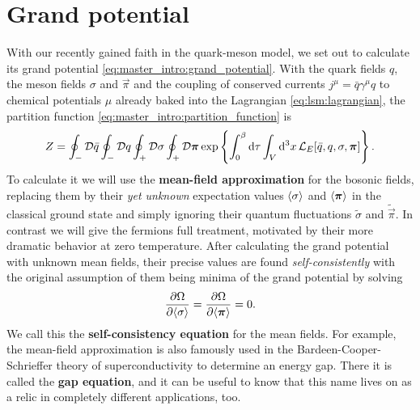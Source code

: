 \section{Grand potential}
\label{sec:lsm:grand_potential}

With our recently gained faith in the quark-meson model,
we set out to calculate its grand potential \eqref{eq:master_intro:grand_potential}.
With the quark fields $q$, the meson fields $\sigma$ and $\vec\pi$
and the coupling of conserved currents $j^\mu = \bar{q} \gamma^\mu q$ to chemical potentials $\mu$ already baked into the Lagrangian \eqref{eq:lsm:lagrangian},
the partition function \eqref{eq:master_intro:partition_function} is
\begin{equation}
	Z = \oint_- \mathcal{D} \bar{q} \oint_- \mathcal{D} q \oint_+ \mathcal{D} \sigma \oint_+ \mathcal{D} {\bm{\pi}} \exp \left\{ \int_0^\beta \mathop{}\!\mathrm{d} \tau \int_V \mathop{}\!\mathrm{d}^3 x \, \mathcal{L}_E[\bar{q}, q, \sigma, {\bm{\pi}}]  \right\} .
\end{equation}
To calculate it we will use the \textbf{mean-field approximation} for the bosonic fields,
replacing them by their \emph{yet unknown} expectation values $\langle \sigma \rangle$ and $\langle {\bm{\pi}} \rangle$ in the classical ground state
and simply ignoring their quantum fluctuations $\tilde{\sigma}$ and $\tilde{\vec\pi}$.
In contrast we will give the fermions full treatment,
motivated by their more dramatic behavior at zero temperature.
After calculating the grand potential with unknown mean fields,
their precise values are found \emph{self-consistently} with the original assumption of them being minima of the grand potential by solving
\begin{equation}
	\pdv{\Omega}{ \langle \sigma \rangle} = \pdv{\Omega}{ \langle {\bm{\pi}} \rangle} = 0.
\label{eq:lsm:gap_equation}
\end{equation}
We call this the \textbf{self-consistency equation} for the mean fields.
For example, the mean-field approximation is also famously used in the Bardeen-Cooper-Schrieffer theory of superconductivity to determine an energy gap.
There it is called the \textbf{gap equation}, 
and it can be useful to know that this name lives on as a relic in completely different applications, too.

